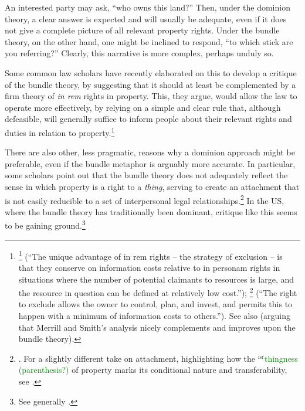 \documentclass[12pt,a4paper]{book} %
\newcommand{\isr}[1]{\textcolor{green}{$^{\textrm{isr}}${#1}}}
\begin{document}
An interested party may ask, ``who owns this land?'' Then, under the dominion theory, a clear answer is expected and will usually be adequate, even if it does not give a complete picture of all relevant property rights. Under the bundle theory, on the other hand, one might be inclined to respond, ``to which stick are you referring?'' Clearly, this narrative is more complex, perhaps unduly so. 

Some common law scholars have recently elaborated on this to develop a critique of the bundle theory, by suggesting that it should at least be complemented by a firm theory of {\it in rem} rights in property. This, they argue, would allow the law to operate more effectively, by relying on a simple and clear rule that, although defeasible, will generally suffice to inform people about their relevant rights and duties in relation to property.\footnote{\footcite[793]{merrill01b} (``The unique advantage of in rem rights -- the strategy of exclusion -- is that they conserve on information costs relative to in personam rights in situations where the number of potential claimants to resources is large, and the resource in question can be defined at relatively low cost.''); \footcite[389]{merrill01} (``The right to exclude allows the owner to control, plan, and invest, and permits this to happen with a minimum of information costs to others.''). See also \cite{ellickson11} (arguing that Merrill and Smith's analysis nicely complements and improves upon the bundle theory).} 

There are also other, less pragmatic, reasons why a dominion approach might be preferable, even if the bundle metaphor is arguably more accurate. In particular, some scholars point out that the bundle theory does not adequately reflect the sense in which property is a right to a {\it thing}, serving to create an attachment that is not easily reducible to a set of interpersonal legal relationships.\footnote{\cite[1862]{merrill07}. For a slightly different take on attachment, highlighting how the \isr{thingness (parenthesis?)} of property marks its conditional nature and transferability, see \cite[799-818]{penner96}.} In the US, where the bundle theory has traditionally been dominant, critique like this seems to be gaining ground.\footnote{See generally \cite{foster10}.}
\end{document}
